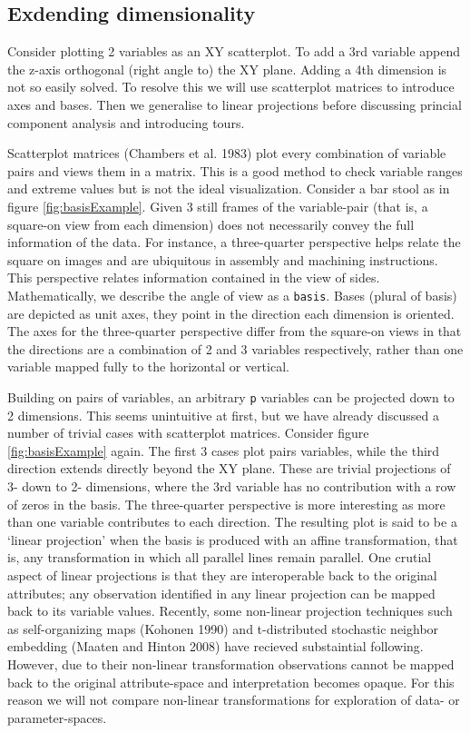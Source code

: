 \documentclass[11,]{article}
\begin{document}
\hypertarget{exdending-dimensionality}{%
\subsection{Exdending dimensionality}\label{exdending-dimensionality}}

Consider plotting 2 variables as an XY scatterplot. To add a 3rd variable append the z-axis orthogonal (right angle to) the XY plane. Adding a 4th dimension is not so easily solved. To resolve this we will use scatterplot matrices to introduce axes and bases. Then we generalise to linear projections before discussing princial component analysis and introducing tours.

Scatterplot matrices (Chambers et al. 1983) plot every combination of variable pairs and views them in a matrix. This is a good method to check variable ranges and extreme values but is not the ideal visualization. Consider a bar stool as in figure \ref{fig:basisExample}. Given 3 still frames of the variable-pair (that is, a square-on view from each dimension) does not necessarily convey the full information of the data. For instance, a three-quarter perspective helps relate the square on images and are ubiquitous in assembly and machining instructions. This perspective relates information contained in the view of sides. Mathematically, we describe the angle of view as a \texttt{basis}. Bases (plural of basis) are depicted as unit axes, they point in the direction each dimension is oriented. The axes for the three-quarter perspective differ from the square-on views in that the directions are a combination of 2 and 3 variables respectively, rather than one variable mapped fully to the horizontal or vertical.

Building on pairs of variables, an arbitrary \texttt{p} variables can be projected down to 2 dimensions. This seems unintuitive at first, but we have already discussed a number of trivial cases with scatterplot matrices. Consider figure \ref{fig:basisExample} again. The first 3 cases plot pairs variables, while the third direction extends directly beyond the XY plane. These are trivial projections of 3- down to 2- dimensions, where the 3rd variable has no contribution with a row of zeros in the basis. The three-quarter perspective is more interesting as more than one variable contributes to each direction. The resulting plot is said to be a `linear projection' when the basis is produced with an affine transformation, that is, any transformation in which all parallel lines remain parallel. One crutial aspect of linear projections is that they are interoperable back to the original attributes; any observation identified in any linear projection can be mapped back to its variable values. Recently, some non-linear projection techniques such as
self-organizing maps (Kohonen 1990) and t-distributed stochastic neighbor embedding (Maaten and Hinton 2008) have recieved substaintial following. However, due to their non-linear transformation observations cannot be mapped back to the original attribute-space and interpretation becomes opaque. For this reason we will not compare non-linear transformations for exploration of data- or parameter-spaces.
\end{document}
